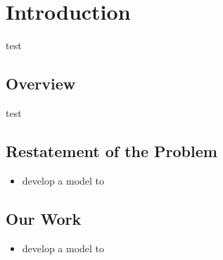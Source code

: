 \setcounter{page}{1}

\section{Introduction}

test

\subsection{Overview}

test

\subsection{Restatement of the Problem}

\begin{itemize}
    \item develop a model to 
\end{itemize}

\subsection{Our Work}

\begin{itemize}
    \item develop a model to 
\end{itemize}